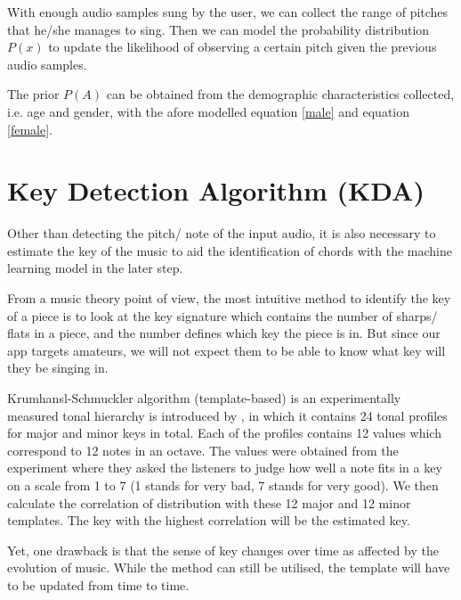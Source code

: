 With enough audio samples sung by the user, we can collect the range of pitches that he/she manages to sing. Then we can model 
the probability distribution $P(x)$ to update the likelihood of observing a certain pitch given the previous audio samples.

The prior $P(A)$ can be obtained from the demographic characteristics collected, i.e. age and gender, with the afore modelled equation
\ref{male} and equation \ref{female}.

\section{Key Detection Algorithm (KDA)}
\label{sec:KDA}
Other than detecting the pitch/ note of the input audio, it is also necessary to estimate the key of the music to aid the identification
of chords with the machine learning model in the later step.

From a music theory point of view, the most intuitive method to identify the key of a piece is to look at the key signature which contains the number of sharps/ flats
in a piece, and the number defines which key the piece is in. But since our app targets amateurs, we will not expect them to be able to know what key will they be singing
in.

Krumhansl-Schmuckler algorithm (template-based)  is an experimentally measured tonal hierarchy is introduced by \cite{templatedata}, in which it contains 
24 tonal profiles for major and minor keys in total.
Each of the profiles contains 12 values which correspond to 12 notes in an octave. The values were obtained from the experiment where they asked the listeners to judge how well
a note fits in a key on a scale from 1 to 7 (1 stands for very bad, 7 stands for very good). We then calculate the correlation of distribution with these 12 major and 12 minor
templates. The key with the highest correlation will be the estimated key.

Yet, one drawback is that the sense of key changes over time as affected by the evolution of music. While the method can still be utilised, the template will have to be
updated from time to time.

